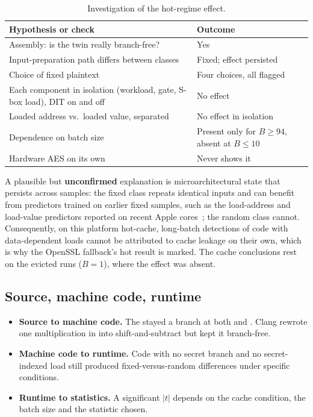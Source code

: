 \begin{table}[htbp]
\centering
\small
\renewcommand{\arraystretch}{1.15}
\begin{tabular}{@{}P{0.55\textwidth}P{0.35\textwidth}@{}}
\toprule
Hypothesis or check & Outcome \\
\midrule
Assembly: is the twin really branch-free? & Yes \\
Input-preparation path differs between classes & Fixed; effect persisted \\
Choice of fixed plaintext & Four choices, all flagged \\
Each component in isolation (workload, gate, S-box load), DIT on and off & No effect \\
Loaded address vs.\ loaded value, separated & No effect in isolation \\
Dependence on batch size & Present only for $B \ge 94$, absent at $B \le 10$ \\
Hardware AES on its own & Never shows it \\
\bottomrule
\end{tabular}
\caption{Investigation of the hot-regime effect.}
\label{tab:investigation}
\end{table}

A plausible but \textbf{unconfirmed} explanation is microarchitectural state that persists across samples: the fixed class repeats identical inputs and can benefit from predictors trained on earlier fixed samples, such as the load-address and load-value predictors reported on recent Apple cores~\cite{flop,slap}; the random class cannot. Consequently, on this platform hot-cache, long-batch detections of code with data-dependent loads cannot be attributed to cache leakage on their own, which is why the OpenSSL fallback's hot result is marked. The cache conclusions rest on the evicted runs ($B = 1$), where the effect was absent.

\subsection{Source, machine code, runtime}

\begin{itemize}
  \item \textbf{Source to machine code.} The  stayed a branch at both  and . Clang rewrote one multiplication in  into shift-and-subtract but kept it branch-free.
  \item \textbf{Machine code to runtime.} Code with no secret branch and no secret-indexed load still produced fixed-versus-random differences under specific conditions.
  \item \textbf{Runtime to statistics.} A significant $\lvert t\rvert$ depends on the cache condition, the batch size and the statistic chosen.
\end{itemize}

